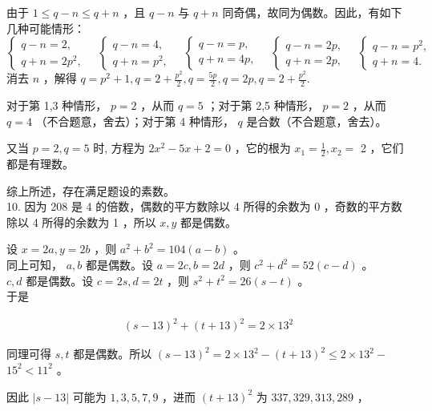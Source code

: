 \documentclass[10pt]{article}
\begin{document}
由于 $1 \leqslant q-n \leqslant q+n$ ，且 $q-n$ 与 $q+n$ 同奇偶，故同为偶数。因此，有如下几种可能情形：\\
$\left\{\begin{array}{l}q-n=2, \\ q+n=2 p^{2},\end{array} \quad\left\{\begin{array}{l}q-n=4, \\ q+n=p^{2},\end{array} \quad\left\{\begin{array}{l}q-n=p, \\ q+n=4 p,\end{array} \quad\left\{\begin{array}{l}q-n=2 p, \\ q+n=2 p,\end{array} \quad\left\{\begin{array}{l}q-n=p^{2}, \\ q+n=4 .\end{array}\right.\right.\right.\right.\right.$消去 $n$ ，解得 $q=p^{2}+1, q=2+\frac{p^{2}}{2}, q=\frac{5 p}{2}, q=2 p, q=2+\frac{p^{2}}{2}$.

对于第 1,3 种情形， $p=2$ ，从而 $q=5$ ；对于第 2,5 种情形， $p=2$ ，从而 $q=4$ （不合题意，舍去）；对于第 4 种情形， $q$ 是合数（不合题意，舍去）。

又当 $p=2, q=5$ 时, 方程为 $2 x^{2}-5 x+2=0$ ，它的根为 $x_{1}=\frac{1}{2}, x_{2}=$ 2 ，它们都是有理数。

综上所述，存在满足题设的素数。\\
10. 因为 208 是 4 的倍数，偶数的平方数除以 4 所得的余数为 0 ，奇数的平方数除以 4 所得的余数为 1 ，所以 $x, y$ 都是偶数。

设 $x=2 a, y=2 b$ ，则 $a^{2}+b^{2}=104(a-b)$ 。\\
同上可知， $a, b$ 都是偶数。设 $a=2 c, b=2 d$ ，则 $c^{2}+d^{2}=52(c-d)$ 。\\
$c, d$ 都是偶数。设 $c=2 s, d=2 t$ ，则 $s^{2}+t^{2}=26(s-t)$ 。\\
于是

\begin{align*}
(s-13)^{2}+(t+13)^{2}=2 \times 13^{2}
\end{align*}

同理可得 $s, t$ 都是偶数。所以 $(s-13)^{2}=2 \times 13^{2}-(t+13)^{2} \leqslant 2 \times 13^{2}-$ $15^{2}<11^{2}$ 。

因此 $|s-13|$ 可能为 $1,3,5,7,9$ ，进而 $(t+13)^{2}$ 为 $337,329,313,289$ ，
\end{document}
